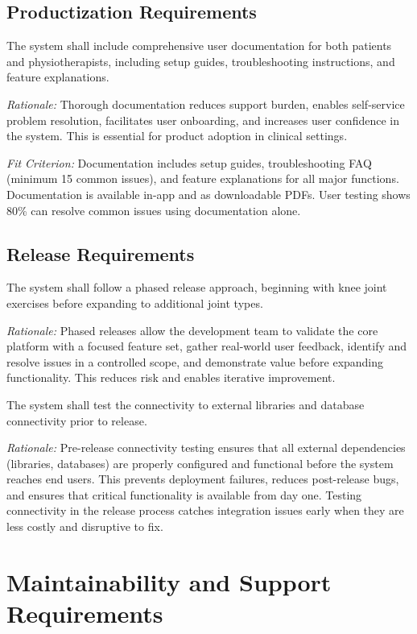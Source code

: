 \documentclass[12pt]{article}
\newcommand{\rationale}[1]{\par\emph{Rationale:} #1}
\newcommand{\fitcrit}[1]{\par\emph{Fit Criterion:} #1}
\begin{document}
\subsection{Productization Requirements}
\begin{reqlist}
	\item[OER-PR 1.] The system shall include comprehensive user documentation for both patients and physiotherapists, including setup guides, troubleshooting instructions, and feature explanations.
	\rationale{Thorough documentation reduces support burden, enables self-service problem resolution, facilitates user onboarding, and increases user confidence in the system. This is essential for product adoption in clinical settings.}
	\fitcrit{Documentation includes setup guides, troubleshooting FAQ (minimum 15 common issues), and feature explanations for all major functions. Documentation is available in-app and as downloadable PDFs. User testing shows 80\% can resolve common issues using documentation alone.}
\end{reqlist}

\subsection{Release Requirements}
\begin{reqlist}
	\item[OER-RL 1.] The system shall follow a phased release approach, beginning with knee joint exercises before expanding to additional joint types.
	\rationale{Phased releases allow the development team to validate the core platform with a focused feature set, gather real-world user feedback, identify and resolve issues in a controlled scope, and demonstrate value before expanding functionality. This reduces risk and enables iterative improvement.}
	
	\item[OER-RL 2.] The system shall test the connectivity to external libraries and database connectivity prior to release.
	\rationale{Pre-release connectivity testing ensures that all external dependencies (libraries, databases) are properly configured and functional before the system reaches end users. This prevents deployment failures, reduces post-release bugs, and ensures that critical functionality is available from day one. Testing connectivity in the release process catches integration issues early when they are less costly and disruptive to fix.}
\end{reqlist}

\section{Maintainability and Support Requirements}
\end{document}
